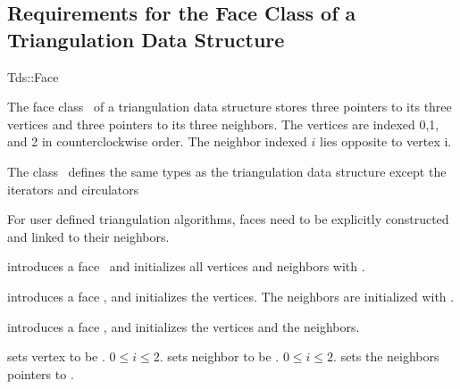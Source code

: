 \subsection{Requirements for the Face  Class of a Triangulation Data Structure}
\label{I1_Sect_Tds_Face}
\begin{ccClass}{Tds::Face}

\ccThreeToTwo

The face class \ccClassName\ of a triangulation data structure
stores three pointers to its three vertices
and three pointers to its three neighbors.
The vertices are indexed 0,1, and 2 in counterclockwise order.
The  neighbor indexed $i$ lies
opposite to vertex i. 

\ccInheritsFrom {}

\ccTypes
The class \ccClassName\ defines the same types as 
the triangulation data structure 
except the iterators and circulators


\begin{ccAdvanced}
For user defined triangulation algorithms, faces need to
be explicitly constructed and linked to their neighbors.

{introduces a face \ccVar\ and initializes all vertices and neighbors 
 with .}

{introduces a face \ccVar, and initializes the vertices. The 
neighbors are initialized with .}

{introduces a face \ccVar, and initializes the vertices and the neighbors.}



{sets vertex  to be .
\ccPrecond $0\leq i \leq 2$.
}
\ccGlue
{}
{sets neighbor  to be .
\ccPrecond $0\leq i \leq 2$.
}
\ccGlue
{}
\ccGlue
{}
\ccGlue
{} {sets the neighbors pointers to .}
\ccGlue
{}


\end{ccAdvanced}
\end{ccClass}
